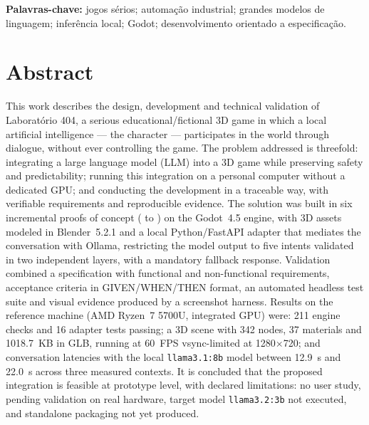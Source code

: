 \vspace{1em}
\noindent\textbf{Palavras-chave:} jogos sérios; automação industrial; grandes
modelos de linguagem; inferência local; Godot; desenvolvimento orientado a
especificação.

\newpage

\chapter*{Abstract}

\SingleSpacing

This work describes the design, development and technical validation of
Laboratório 404, a serious educational/fictional 3D game in which a local
artificial intelligence --- the character \aria{} --- participates in the world
through dialogue, without ever controlling the game. The problem addressed is
threefold: integrating a large language model (LLM) into a 3D game while
preserving safety and predictability; running this integration on a personal
computer without a dedicated GPU; and conducting the development in a traceable
way, with verifiable requirements and reproducible evidence. The solution was
built in six incremental proofs of concept ( to ) on the Godot~4.5
engine, with 3D assets modeled in Blender~5.2.1 and a local Python/FastAPI
adapter that mediates the conversation with Ollama, restricting the model output
to five intents validated in two independent layers, with a mandatory fallback
response. Validation combined a specification with functional and non-functional
requirements, acceptance criteria in GIVEN/WHEN/THEN format, an automated
headless test suite and visual evidence produced by a screenshot harness. Results
on the reference machine (AMD Ryzen~7 5700U, integrated GPU) were: 211 engine
checks and 16 adapter tests passing; a 3D scene with 342 nodes, 37 materials and
1018.7~KB in GLB, running at 60~FPS vsync-limited at 1280$\times$720; and
conversation latencies with the local \texttt{llama3.1:8b} model between 12.9~s
and 22.0~s across three measured contexts. It is concluded that the proposed
integration is feasible at prototype level, with declared limitations: no user
study, pending validation on real hardware, target model \texttt{llama3.2:3b}
not executed, and standalone packaging not yet produced.

